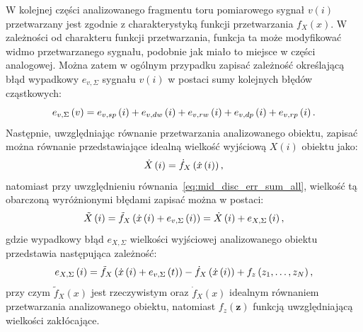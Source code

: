 W kolejnej części analizowanego fragmentu toru pomiarowego sygnał $v(i)$ przetwarzany jest zgodnie z charakterystyką funkcji przetwarzania $f_{X}(x)$. W zależności od charakteru funkcji przetwarzania, funkcja ta może modyfikować widmo przetwarzanego sygnału, podobnie jak miało to miejsce w części analogowej. Można zatem w ogólnym przypadku zapisać zależność określającą błąd wypadkowy $e_{v,\Sigma}$ sygnału $v(i)$ w postaci sumy kolejnych błędów cząstkowych:
\begin{equation}
e_{v,\Sigma} \left(v\right) = e_{v,sp} \left(i\right) + e_{v,dw} \left(i\right) + e_{v,rw} \left(i\right) + e_{v,dp} \left(i\right) + e_{v,rp} \left(i\right) \label{eq:mid_disc_err_sum_all}.
\end{equation}
Następnie, uwzględniając równanie przetwarzania analizowanego obiektu, zapisać można równanie przedstawiające idealną wielkość wyjściową $X(i)$ obiektu jako:
\begin{equation}
\dot{X} \left(i\right) = \dot{f}_{X} \left( \dot{x} \left(i\right) \right) \label{eq:out_disc_ideal_all},
\end{equation}
natomiast przy uwzględnieniu równania~\eqref{eq:mid_disc_err_sum_all}, wielkość tą obarczoną wyróżnionymi błędami zapisać można w postaci:
\begin{equation}
\tilde{X} \left(i\right) = \tilde{f}_{X} \left( \dot{x} \left(i\right) + e_{v,\Sigma} \left(i\right) \right) = \dot{X} \left(i\right) + e_{X,\Sigma} \left(i\right) \label{eq:out_disc_real_all},
\end{equation}
gdzie wypadkowy błąd $e_{X,\Sigma}$ wielkości wyjściowej analizowanego obiektu przedstawia następująca zależność:
\begin{equation}
e_{X,\Sigma} \left(i\right) = \tilde{f}_{X} \left( \dot{x} \left(i\right) + e_{v,\Sigma} \left(t\right) \right) - \dot{f}_{X} \left( \dot{x} \left(i\right) \right) + f_{z} \left( z_{1}, \hdots, z_{N} \right) \label{eq:out_disc_err_sum_all},
\end{equation}
przy czym $\tilde{f}_{X}(x)$ jest rzeczywistym oraz $\dot{f}_{X}(x)$ idealnym równaniem przetwarzania analizowanego obiektu, natomiast $f_{z}(\mathbf{z})$ funkcją uwzględniającą wielkości zakłócające.

